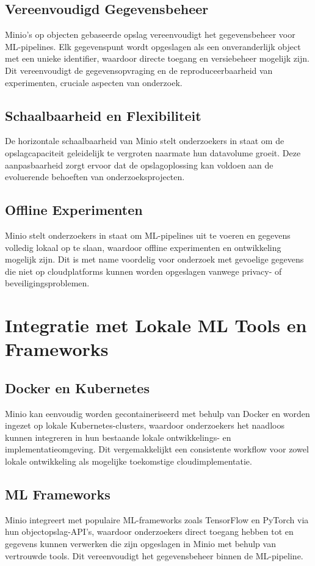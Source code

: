 \subsection{Vereenvoudigd Gegevensbeheer}
Minio's op objecten gebaseerde opslag vereenvoudigt het gegevensbeheer voor ML-pipelines. Elk gegevenspunt wordt opgeslagen als een onveranderlijk object met een unieke identifier, waardoor directe toegang en versiebeheer mogelijk zijn. Dit vereenvoudigt de gegevensopvraging en de reproduceerbaarheid van experimenten, cruciale aspecten van onderzoek.

\subsection{Schaalbaarheid en Flexibiliteit}
De horizontale schaalbaarheid van Minio stelt onderzoekers in staat om de opslagcapaciteit geleidelijk te vergroten naarmate hun datavolume groeit. Deze aanpasbaarheid zorgt ervoor dat de opslagoplossing kan voldoen aan de evoluerende behoeften van onderzoeksprojecten.

\subsection{Offline Experimenten}
Minio stelt onderzoekers in staat om ML-pipelines uit te voeren en gegevens volledig lokaal op te slaan, waardoor offline experimenten en ontwikkeling mogelijk zijn. Dit is met name voordelig voor onderzoek met gevoelige gegevens die niet op cloudplatforms kunnen worden opgeslagen vanwege privacy- of beveiligingsproblemen.

\section{Integratie met Lokale ML Tools en Frameworks}

\subsection{Docker en Kubernetes}
Minio kan eenvoudig worden gecontaineriseerd met behulp van Docker en worden ingezet op lokale Kubernetes-clusters, waardoor onderzoekers het naadloos kunnen integreren in hun bestaande lokale ontwikkelings- en implementatieomgeving. Dit vergemakkelijkt een consistente workflow voor zowel lokale ontwikkeling als mogelijke toekomstige cloudimplementatie.

\subsection{ML Frameworks}
Minio integreert met populaire ML-frameworks zoals TensorFlow en PyTorch via hun objectopslag-API's, waardoor onderzoekers direct toegang hebben tot en gegevens kunnen verwerken die zijn opgeslagen in Minio met behulp van vertrouwde tools. Dit vereenvoudigt het gegevensbeheer binnen de ML-pipeline.


